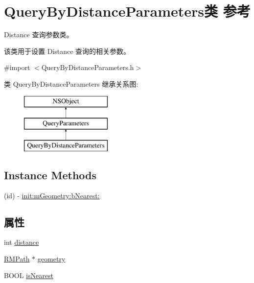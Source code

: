 \hypertarget{interface_query_by_distance_parameters}{\section{Query\-By\-Distance\-Parameters类 参考}
\label{interface_query_by_distance_parameters}
}


Distance 查询参数类。\par
 该类用于设置 Distance 查询的相关参数。  




{\ttfamily \#import $<$Query\-By\-Distance\-Parameters.\-h$>$}

类 Query\-By\-Distance\-Parameters 继承关系图\-:\begin{figure}[H]
\begin{center}
\leavevmode
\includegraphics[height=3.000000cm]{interface_query_by_distance_parameters}
\end{center}
\end{figure}
\subsection*{Instance Methods}
\begin{DoxyCompactItemize}
\item 
(id) -\/ \hyperlink{interface_query_by_distance_parameters_ae53a8d12fd2fca675c20d8992de5904d}{init\-:m\-Geometry\-:b\-Nearest\-:}
\end{DoxyCompactItemize}
\subsection*{属性}
\begin{DoxyCompactItemize}
\item 
int \hyperlink{interface_query_by_distance_parameters_ac1c0a5fa9f00deef5914f67e1f95df54}{distance}
\item 
\hyperlink{interface_r_m_path}{R\-M\-Path} $\ast$ \hyperlink{interface_query_by_distance_parameters_a4eeba7af45b232d8a0354f13e4e033b4}{geometry}
\item 
B\-O\-O\-L \hyperlink{interface_query_by_distance_parameters_a45bb2b68e940f017d2809a6ba9485a89}{is\-Nearest}
\end{DoxyCompactItemize}


